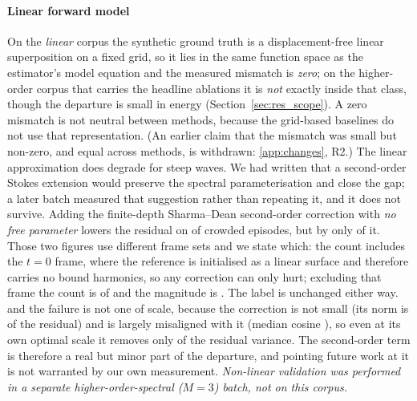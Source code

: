 \documentclass[review]{elsarticle}
\begin{document}
\paragraph{Linear forward model}
On the \emph{linear} corpus the synthetic ground truth is a displacement-free linear
superposition on a fixed grid, so it lies in the same function space as the estimator's
model equation and the measured mismatch is \emph{zero}; on the higher-order corpus
that carries the headline ablations it is \emph{not} exactly inside that class, though
the departure is small in energy (Section~\ref{sec:res_scope}). A zero mismatch is not
neutral between methods, because the grid-based baselines do not use that representation.
(An earlier claim that the mismatch was small but non-zero, and equal across methods,
is withdrawn: \ref{app:changes}, R2.) The linear approximation does
degrade for steep waves. We had written that a second-order Stokes extension would
preserve the spectral parameterisation and close the gap; a later batch measured that
suggestion rather than repeating it, and it does not survive. Adding the finite-depth
Sharma--Dean second-order correction with \emph{no free parameter} lowers the
residual on \CTwoWin{} of \CTwoN{} crowded episodes, but by only \CTwoRel{} of it.
Those two figures use different frame sets and we state which: the count includes the
$t{=}0$ frame, where the reference is initialised as a linear surface and therefore
carries no bound harmonics, so any correction can only hurt; excluding that frame the
count is \CTwoWinNoZero{} of \CTwoN{} and the magnitude is \CTwoRel{}. The label is
unchanged either way. and the failure
is not one of scale, because the correction is not small (its norm is \CTwoCOverR{} of
the residual) and is largely misaligned with it (median cosine \CTwoCos{}), so even at
its own optimal scale it removes only \CTwoOptPct{} of the residual variance. The
second-order term is therefore a real but minor part of the departure, and pointing
future work at it is not warranted by our own measurement.
\emph{Non-linear validation was performed in a separate
higher-order-spectral ($M{=}3$) batch, not on this corpus.}
\end{document}
